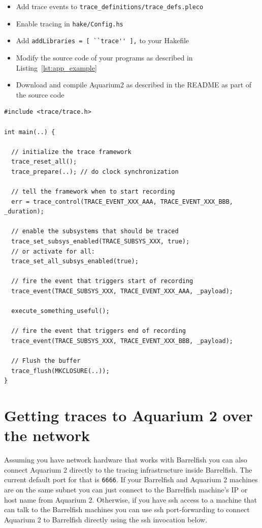 \documentclass[a4paper,11pt,twoside]{report}
\begin{document}
\begin{itemize}
\item Add trace events to \lstinline{trace_definitions/trace_defs.pleco}
\item Enable tracing in \lstinline{hake/Config.hs}
\item Add \lstinline{addLibraries = [ ``trace'' ],} to your Hakefile
\item Modify the source code of your programs as described in
  Listing~\ref{lst:app_example}
\item Download and compile Aquarium2 as described in the README as
  part of the source code
\end{itemize}

\begin{code}
\begin{lstlisting}[frame=single, caption={Enable tracing for an application}, label={lst:app_example}]
#include <trace/trace.h>

int main(..) {

  // initialize the trace framework
  trace_reset_all();
  trace_prepare(..); // do clock synchronization

  // tell the framework when to start recording
  err = trace_control(TRACE_EVENT_XXX_AAA, TRACE_EVENT_XXX_BBB, _duration);

  // enable the subsystems that should be traced
  trace_set_subsys_enabled(TRACE_SUBSYS_XXX, true);
  // or activate for all:
  trace_set_all_subsys_enabled(true);

  // fire the event that triggers start of recording
  trace_event(TRACE_SUBSYS_XXX, TRACE_EVENT_XXX_AAA, _payload);

  execute_something_useful();

  // fire the event that triggers end of recording
  trace_event(TRACE_SUBSYS_XXX, TRACE_EVENT_XXX_BBB, _payload);

  // Flush the buffer
  trace_flush(MKCLOSURE(..));
}
\end{lstlisting}
\end{code}

\section{Getting traces to Aquarium 2 over the network}

Assuming you have network hardware that works with Barrelfish you can also
connect Aquarium 2 directly to the tracing infrastructure inside Barrelfish. The
current default port for that is \verb!6666!.  If your Barrelfish and Aquarium 2
machines are on the same subnet you can just connect to the Barrelfish machine's
IP or host name from Aquarium 2.  Otherwise, if you have ssh access to a machine
that can talk to the Barrelfish machines you can use ssh port-forwarding to
connect Aquarium 2 to Barrelfish directly using the ssh invocation below.
\end{document}
